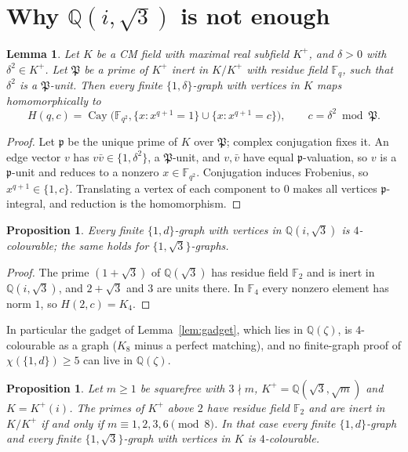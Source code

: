 \documentclass[11pt,a4paper]{amsart}
\newtheorem{lemma}[theorem]{Lemma}
\newtheorem{proposition}[theorem]{Proposition}
\theoremstyle{remark}
\newcommand{\Q}{\mathbb{Q}}
\newcommand{\F}{\mathbb{F}}
\begin{document}
\section{Why $\Q(i,\sqrt3)$ is not enough}

\begin{lemma}\label{lem:reduction}
Let $K$ be a CM field with maximal real subfield $K^+$, and $\delta>0$ with $\delta^2\in K^+$. Let $\mathfrak P$ be a prime of $K^+$ inert in $K/K^+$ with residue field $\F_q$, such that $\delta^2$ is a $\mathfrak P$-unit. Then every finite $\{1,\delta\}$-graph with vertices in $K$ maps homomorphically to
\[
H(q,c)=\operatorname{Cay}\bigl(\F_{q^2},\{x:x^{q+1}=1\}\cup\{x:x^{q+1}=c\}\bigr),\qquad c=\delta^2\bmod\mathfrak P.
\]
\end{lemma}

\begin{proof}
Let $\mathfrak p$ be the unique prime of $K$ over $\mathfrak P$; complex conjugation fixes it. An edge vector $v$ has $v\bar v\in\{1,\delta^2\}$, a $\mathfrak P$-unit, and $v,\bar v$ have equal $\mathfrak p$-valuation, so $v$ is a $\mathfrak p$-unit and reduces to a nonzero $x\in\F_{q^2}$. Conjugation induces Frobenius, so $x^{q+1}\in\{1,c\}$. Translating a vertex of each component to $0$ makes all vertices $\mathfrak p$-integral, and reduction is the homomorphism.
\end{proof}

\begin{proposition}\label{prop:zeta12}
Every finite $\{1,d\}$-graph with vertices in $\Q(i,\sqrt3)$ is $4$-colourable; the same holds for $\{1,\sqrt3\}$-graphs.
\end{proposition}

\begin{proof}
The prime $(1+\sqrt3)$ of $\Q(\sqrt3)$ has residue field $\F_2$ and is inert in $\Q(i,\sqrt3)$, and $2+\sqrt3$ and $3$ are units there. In $\F_4$ every nonzero element has norm $1$, so $H(2,c)=K_4$.
\end{proof}

In particular the gadget of Lemma~\ref{lem:gadget}, which lies in $\Q(\zeta)$, is $4$-colourable as a graph ($K_8$ minus a perfect matching), and no finite-graph proof of $\chi(\{1,d\})\ge5$ can live in $\Q(\zeta)$.

\begin{proposition}\label{prop:mod8}
Let $m\ge1$ be squarefree with $3\nmid m$, $K^+=\Q(\sqrt3,\sqrt m)$ and $K=K^+(i)$. The primes of $K^+$ above $2$ have residue field $\F_2$ and are inert in $K/K^+$ if and only if $m\equiv1,2,3,6\pmod 8$. In that case every finite $\{1,d\}$-graph and every finite $\{1,\sqrt3\}$-graph with vertices in $K$ is $4$-colourable.
\end{proposition}
\end{document}
